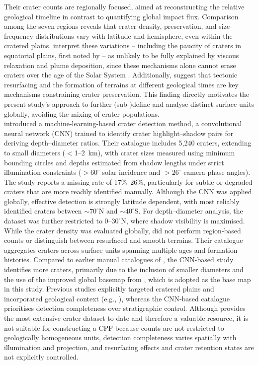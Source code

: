 \documentclass[preprint,11pt,3p,times,authoryear]{elsarticle}
\begin{document}
Their crater counts are regionally focused, aimed at reconstructing the relative geological timeline in contrast to quantifying global impact flux. Comparison among the seven regions reveals that crater density, preservation, and size-frequency distributions vary with latitude and hemisphere, even within the cratered plains. \citet{Kinczyk2024} interpret these variations -- including the paucity of craters in equatorial plains, first noted by \cite{Kirchoff2009} -- as unlikely to be fully explained by viscous relaxation and plume deposition, since these mechanisms alone cannot erase craters over the age of the Solar System \citep{Bland2012}. Additionally, \citet{Kinczyk2024} suggest that tectonic resurfacing and the formation of terrains at different geological times are key mechanisms constraining crater preservation. This finding directly motivates the present study's approach to further (sub-)define and analyse distinct surface units globally, avoiding the mixing of crater populations.\\

\citet{Blanco-Rojas2024} introduced a machine-learning-based crater detection method, a convolutional neural network (CNN) trained to identify crater highlight–shadow pairs for deriving depth–diameter ratios. Their catalogue includes 5,240 craters, extending to small diameters ($<$1–2~km), with crater sizes measured using minimum bounding circles and depths estimated from shadow lengths under strict illumination constraints ($>60^{\circ}$ solar incidence and $>26^{\circ}$ camera phase angles). The study reports a missing rate of 17\%–26\%, particularly for subtle or degraded craters that are more readily identified manually. Although the CNN was applied globally, effective detection is strongly latitude dependent, with most reliably identified craters between $\sim70^{\circ}$N and $\sim40^{\circ}$S. For depth–diameter analysis, the dataset was further restricted to $0$–$30^{\circ}$N, where shadow visibility is maximised.\\

While the crater density was evaluated globally, \citet{Blanco-Rojas2024} did not perform region-based counts or distinguish between resurfaced and smooth terrains. Their catalogue aggregates craters across surface units spanning multiple ages and formation histories. Compared to earlier manual catalogues of \citet{Kirchoff2009}, the CNN-based study identifies more craters, primarily due to the inclusion of smaller diameters and the use of the improved global basemap from \citet{Bland2018}, which is adopted as the base map in this study. Previous studies explicitly targeted cratered plains and incorporated geological context (e.g., \citealt{CrowWillard2015}), whereas the CNN-based catalogue prioritises detection completeness over stratigraphic control. Although \citet{Blanco-Rojas2024} provides the most extensive crater dataset to date and therefore a valuable resource, it is not suitable for constructing a CPF because counts are not restricted to geologically homogeneous units, detection completeness varies spatially with illumination and projection, and resurfacing effects and crater retention states are not explicitly controlled.\\
\end{document}
